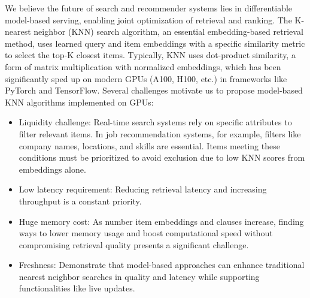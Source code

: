 We believe the future of search and recommender systems lies in differentiable model-based serving, enabling joint optimization of retrieval and ranking. The K-nearest neighbor (KNN) search algorithm, an essential embedding-based retrieval method, uses learned query and item embeddings with a specific similarity metric to select the top-K closest items. Typically, KNN uses dot-product similarity, a form of matrix multiplication with normalized embeddings, which has been significantly sped up on modern GPUs (A100, H100, etc.) in frameworks like PyTorch and TensorFlow. Several challenges motivate us to propose model-based KNN algorithms implemented on GPUs:
\begin{itemize}[leftmargin=*]
    \item Liquidity challenge: Real-time search systems rely on specific attributes to filter relevant items. In job recommendation systems, for example, filters like company names, locations, and skills are essential. Items meeting these conditions must be prioritized to avoid exclusion due to low KNN scores from embeddings alone.

    \item Low latency requirement: Reducing retrieval latency and increasing throughput is a constant priority.

    \item Huge memory cost: As number item embeddings and clauses increase, finding ways to lower memory usage and boost computational speed without compromising retrieval quality presents a significant challenge.

    \item Freshness: Demonstrate that model-based approaches can enhance traditional nearest neighbor searches in quality and latency while supporting functionalities like live updates.
\end{itemize}


